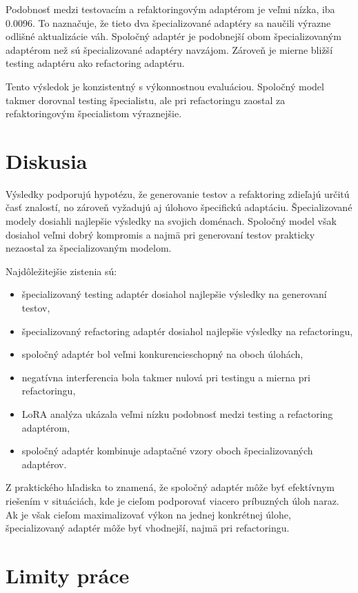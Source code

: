 \documentclass[11pt,a4paper]{article}
\begin{document}
Podobnosť medzi testovacím a refaktoringovým adaptérom je veľmi nízka, iba 0.0096. To naznačuje, že tieto dva špecializované adaptéry sa naučili výrazne odlišné aktualizácie váh. Spoločný adaptér je podobnejší obom špecializovaným adaptérom než sú špecializované adaptéry navzájom. Zároveň je mierne bližší testing adaptéru ako refactoring adaptéru.

Tento výsledok je konzistentný s výkonnostnou evaluáciou. Spoločný model takmer dorovnal testing špecialistu, ale pri refactoringu zaostal za refaktoringovým špecialistom výraznejšie.

\section{Diskusia}

Výsledky podporujú hypotézu, že generovanie testov a refaktoring zdieľajú určitú časť znalostí, no zároveň vyžadujú aj úlohovo špecifickú adaptáciu. Špecializované modely dosiahli najlepšie výsledky na svojich doménach. Spoločný model však dosiahol veľmi dobrý kompromis a najmä pri generovaní testov prakticky nezaostal za špecializovaným modelom.

Najdôležitejšie zistenia sú:
\begin{itemize}
\item špecializovaný testing adaptér dosiahol najlepšie výsledky na generovaní testov,
\item špecializovaný refactoring adaptér dosiahol najlepšie výsledky na refactoringu,
\item spoločný adaptér bol veľmi konkurencieschopný na oboch úlohách,
\item negatívna interferencia bola takmer nulová pri testingu a mierna pri refactoringu,
\item LoRA analýza ukázala veľmi nízku podobnosť medzi testing a refactoring adaptérom,
\item spoločný adaptér kombinuje adaptačné vzory oboch špecializovaných adaptérov.
\end{itemize}

Z praktického hľadiska to znamená, že spoločný adaptér môže byť efektívnym riešením v situáciách, kde je cieľom podporovať viacero príbuzných úloh naraz. Ak je však cieľom maximalizovať výkon na jednej konkrétnej úlohe, špecializovaný adaptér môže byť vhodnejší, najmä pri refactoringu.

\section{Limity práce}
\end{document}

